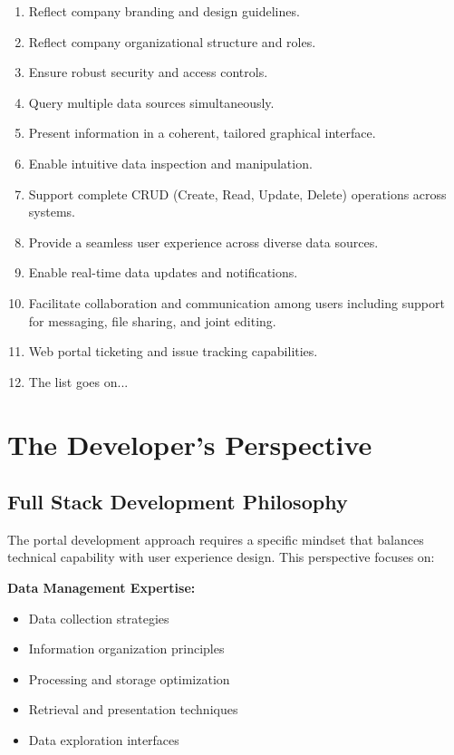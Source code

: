 \begin{enumerate}
\item Reflect company branding and design guidelines.
\item Reflect company organizational structure and roles.
\item Ensure robust security and access controls.
\item Query multiple data sources simultaneously.
\item Present information in a coherent, tailored graphical interface.
\item Enable intuitive data inspection and manipulation.
\item Support complete CRUD (Create, Read, Update, Delete) operations across systems.
\item Provide a seamless user experience across diverse data sources.
\item Enable real-time data updates and notifications.
\item Facilitate collaboration and communication among users including support for messaging, file sharing, and joint editing.
\item Web portal ticketing and issue tracking capabilities.
\item The list goes on...
\end{enumerate}


\section{The Developer's Perspective}

\subsection{Full Stack Development Philosophy}

The portal development approach requires a specific mindset that balances technical capability with user experience design. This perspective focuses on:

\textbf{Data Management Expertise:}
\begin{itemize}
\item Data collection strategies
\item Information organization principles
\item Processing and storage optimization
\item Retrieval and presentation techniques
\item Data exploration interfaces
\end{itemize}

